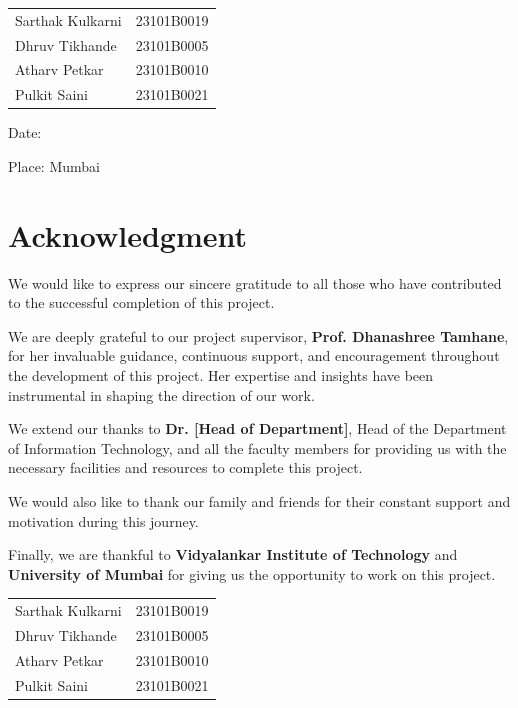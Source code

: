 \documentclass[12pt,a4paper]{report}
\begin{document}
\noindent\begin{tabular}{@{}ll}
    Sarthak Kulkarni & 23101B0019 \\
    Dhruv Tikhande & 23101B0005 \\
    Atharv Petkar & 23101B0010 \\
    Pulkit Saini & 23101B0021 \\
\end{tabular}

\vspace{2cm}

\noindent Date: \underline{\hspace{3cm}}

\noindent Place: Mumbai

\chapter*{Acknowledgment}
\thispagestyle{empty}

We would like to express our sincere gratitude to all those who have contributed to the successful completion of this project.

We are deeply grateful to our project supervisor, \textbf{Prof. Dhanashree Tamhane}, for her invaluable guidance, continuous support, and encouragement throughout the development of this project. Her expertise and insights have been instrumental in shaping the direction of our work.

We extend our thanks to \textbf{Dr. [Head of Department]}, Head of the Department of Information Technology, and all the faculty members for providing us with the necessary facilities and resources to complete this project.

We would also like to thank our family and friends for their constant support and motivation during this journey.

Finally, we are thankful to \textbf{Vidyalankar Institute of Technology} and \textbf{University of Mumbai} for giving us the opportunity to work on this project.

\vspace{2cm}

\noindent\begin{tabular}{@{}ll}
    Sarthak Kulkarni & 23101B0019 \\
    Dhruv Tikhande & 23101B0005 \\
    Atharv Petkar & 23101B0010 \\
    Pulkit Saini & 23101B0021 \\
\end{tabular}
\end{document}
